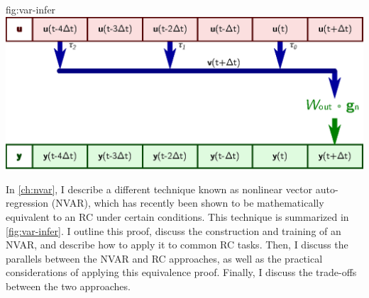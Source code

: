 \begin{reusefigure}{fig:var-infer}
  \includegraphics{figures/var-infer}
  \caption{Summary of the (N)VAR method. Many time-delay taps $\tau_i$
    of the discrete-time signal $\bm{u}(t)$ (top, red) are concatenated into the tap
    vector $\bm{v}(t)$ (middle, blue). Here, there are three taps
    $\tau_0=0$, $\tau_1=2$, and $\tau_2=4$. These taps are then passed
    through a possibly nonlinear function $\bm{g}_\text{n}$ and
    combined linearly by the output matrix $W_\text{out}$ to produce
    the next value of the (N)VAR's output $\bm{y}(t)$ (bottom,
    green). For a linear VAR, $\bm{g}_\text{n}$ is the identity
    function. To transform a whole time series input, this (N)VAR process
    slides along the time axis from left to right.}
\end{reusefigure}

In \cref{ch:nvar}, I describe a different technique known as nonlinear
vector auto-regression (NVAR), which has recently been shown to be
mathematically equivalent to an RC under certain conditions.  This
technique is summarized in \cref{fig:var-infer}.  I outline this
proof, discuss the construction and training of an NVAR, and describe
how to apply it to common RC tasks. Then, I discuss the parallels
between the NVAR and RC approaches, as well as the practical
considerations of applying this equivalence proof. Finally, I discuss
the trade-offs between the two approaches.

